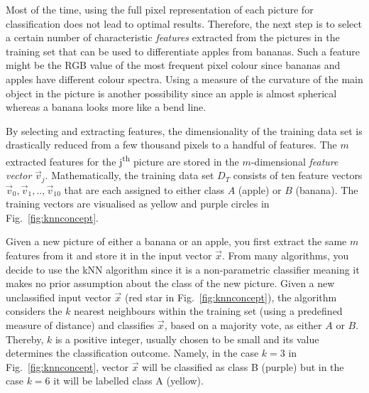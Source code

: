 Most of the time, using the full pixel representation of each picture for classification does not lead to optimal results. Therefore, the next step is to select a certain number of characteristic \emph{features} extracted from the pictures in the training set that can be used to differentiate apples from bananas. Such a feature might be the RGB value of the most frequent pixel colour since bananas and apples have different colour spectra. Using a measure of the curvature of the main object in the picture is another possibility since an apple is almost spherical whereas a banana looks more like a bend line.

By selecting and extracting features, the dimensionality of the training data set is drastically reduced from a few thousand pixels to a handful of features. The $m$ extracted features for the j\textsuperscript{th} picture are stored in the $m$-dimensional \emph{feature vector} $\vec{v}_{j}$. Mathematically, the training data set ${D}_{T}$ consists of ten feature vectors $\vec{v}_{0}, \vec{v}_{1},..,\vec{v}_{10}$ that are each assigned to either class $A$ (apple) or $B$ (banana). The training vectors are visualised as yellow and purple circles in Fig.~\ref{fig:knnconcept}.

Given a new picture of either a banana or an apple, you first extract the same $m$ features from it and store it in the input vector $\vec{x}$. From many algorithms, you decide to use the kNN algorithm since it is a non-parametric classifier meaning it makes no prior assumption about the class of the new picture. Given a new unclassified input vector $\vec{x}$ (red star in Fig.~\ref{fig:knnconcept}), the algorithm considers the $k$ nearest neighbours within the training set (using a predefined measure of distance) and classifies $\vec{x}$, based on a majority vote, as either $A$ or $B$. Thereby, $k$ is a positive integer, usually chosen to be small and its value determines the classification outcome. Namely, in the case $k = 3$ in Fig.~\ref{fig:knnconcept}, vector $\vec{x}$ will be classified as class B (purple) but in the case $k = 6$ it will be labelled class A (yellow).

